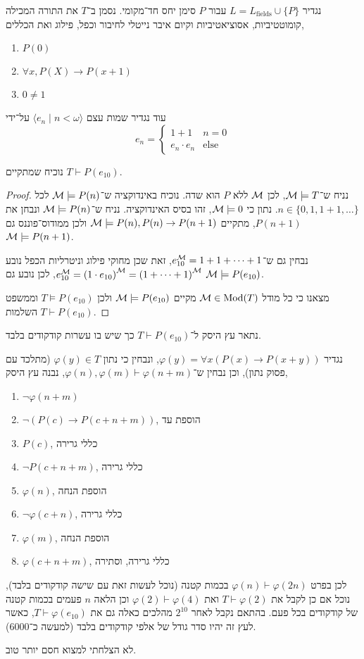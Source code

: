 \question[4]{}
נגדיר $L = L_{\text{fields}} \cup \{ P \}$ עבור $P$ סימן יחס חד־מקומי.
נסמן ב־$T$ את התורה המכילה קומוטטיביות, אסוציאטיביות וקיום איבר נייטלי לחיבור וכפל, פילוג ואת הכללים,
\begin{enumerate}
	\item $P(0)$
	\item $\forall x, P(X) \rightarrow P(x + 1)$
	\item $0 \ne 1$
\end{enumerate}
עוד נגדיר שמות עצם $\langle e_n \mid n < \omega \rangle$ על־ידי
\[
	e_n
	= \begin{cases}
		1 + 1 & n = 0 \\
		e_n \cdot e_n & \text{else}
	\end{cases}
\]

\subquestion{}
נוכיח שמתקיים $T \vdash P(e_{10})$.
\begin{proof}
	נניח ש־$\mathcal{M} \models T$, לכן $\mathcal{M}$ ללא $P$ הוא שדה.
	נוכיח באינדוקציה ש־$\mathcal{M} \models P(n)$ לכל $n \in \{0, 1, 1 + 1, \dots \}$.
	נתון כי $\mathcal{M} \models 0$, זהו בסיס האינדוקציה.
	נניח ש־$\mathcal{M} \models P(n)$ ונבחן את $P(n + 1)$, מתקיים $\mathcal{M} \models P(n), P(n) \rightarrow P(n + 1)$ ולכן ממודוס־פוננס גם $\mathcal{M} \models P(n + 1)$.

	נבחין גם ש־$e_{10}^{\mathcal{M}} = 1 + 1 + \cdots + 1$, זאת שכן מחוקי פילוג וניטרליות הכפל נובע $e_{10}^{\mathcal{M}} = {(1 \cdot e_{10})}^{\mathcal{M}} = {(1 + \cdots + 1)}^{\mathcal{M}}$, לכן נובע גם $\mathcal{M} \models P(e_{10})$.
	
	מצאנו כי כל מודל $\mathcal{M} \in \operatorname{Mod}(T)$ מקיים $\mathcal{M} \models P(e_{10})$ ולכן $T \models P(e_{10})$ וממשפט השלמות $T \vdash P(e_{10})$.
\end{proof}

\subquestion{}
נתאר עץ היסק ל־$T \vdash P(e_{10})$ כך שיש בו עשרות קודקודים בלבד.
\begin{solution}
	נגדיר $\varphi(y) = \forall x (P(x) \rightarrow P(x + y))$, ונבחין כי נתון $\varphi(y) \in T$ (מתלכד עם פסוק נתון), וכן נבחין ש־$\varphi(n), \varphi(m) \vdash \varphi(n + m)$, נבנה עץ היסק,
	\begin{enumerate}
		\item $\lnot \varphi(n + m)$
		\item $\lnot (P(c) \to P(c + n + m))$, הוספת עד
		\item $P(c)$, כללי גרירה
		\item $\lnot P(c + n + m)$, כללי גרירה
		\item $\varphi(n)$, הוספת הנחה
		\item $\lnot \varphi(c + n)$, כללי גרירה
		\item $\varphi(m)$, הוספת הנחה
		\item $\varphi(c + n + m)$, כללי גרירה, וסתירה
	\end{enumerate}
	לכן בפרט $\varphi(n) \vdash \varphi(2n)$ בכמות קטנה (נוכל לעשות זאת עם שישה קודקודים בלבד), נוכל אם כן לקבל את $T \vdash \varphi(2)$ ואת $\varphi(2) \vdash \varphi(4)$ וכן הלאה $n$ פעמים בכמות קטנה של קודקודים בכל פעם.
	בהתאם נקבל לאחר $2^{10}$ מהלכים כאלה גם את $T \vdash \varphi(e_{10})$, כאשר לעץ זה יהיו סדר גודל של אלפי קודקודים בלבד (למעשה כ־6000).

	לא הצלחתי למצוא חסם יותר טוב.
\end{solution}


